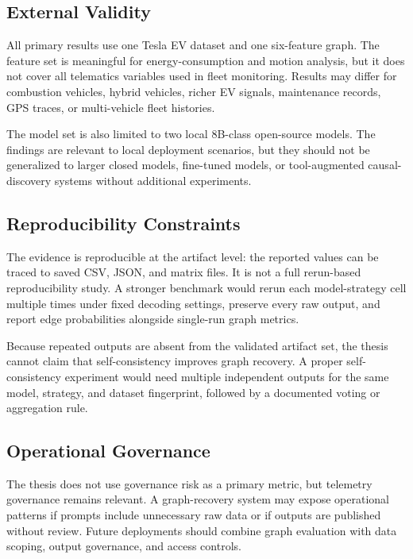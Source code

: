 \subsection{External Validity}

All primary results use one Tesla EV dataset and one six-feature graph. The
feature set is meaningful for energy-consumption and motion analysis, but it
does not cover all telematics variables used in fleet monitoring. Results may
differ for combustion vehicles, hybrid vehicles, richer EV signals,
maintenance records, GPS traces, or multi-vehicle fleet histories.

The model set is also limited to two local 8B-class open-source models. The
findings are relevant to local deployment scenarios, but they should not be
generalized to larger closed models, fine-tuned models, or tool-augmented
causal-discovery systems without additional experiments.

\subsection{Reproducibility Constraints}

The evidence is reproducible at the artifact level: the reported values can
be traced to saved CSV, JSON, and matrix files. It is not a full rerun-based
reproducibility study. A stronger benchmark would rerun each model-strategy
cell multiple times under fixed decoding settings, preserve every raw output,
and report edge probabilities alongside single-run graph metrics.

Because repeated outputs are absent from the validated artifact set, the
thesis cannot claim that self-consistency improves graph recovery. A proper
self-consistency experiment would need multiple independent outputs for the
same model, strategy, and dataset fingerprint, followed by a documented voting
or aggregation rule.

\subsection{Operational Governance}

The thesis does not use governance risk as a primary metric, but telemetry
governance remains relevant. A graph-recovery system may expose operational
patterns if prompts include unnecessary raw data or if outputs are published
without review. Future deployments should combine graph evaluation with data
scoping, output governance, and access controls.

